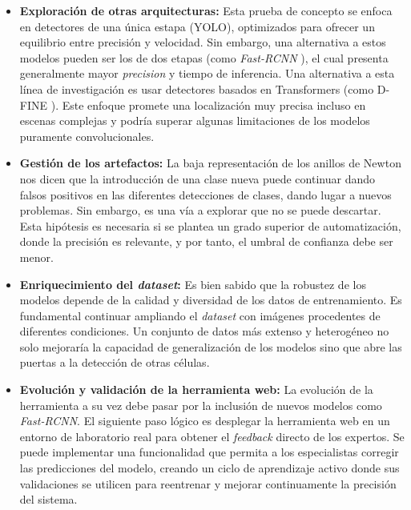 \documentclass[12pt,a4paper,onecolumn,oneside]{report}
\begin{document}
\begin{itemize}
  \item \textbf{Exploración de otras arquitecturas:} Esta prueba de concepto se enfoca en detectores de una única estapa (YOLO), optimizados para ofrecer un equilibrio entre precisión y velocidad. Sin embargo, 
  una alternativa a estos modelos pueden ser los de dos etapas (como \textit{Fast-RCNN} \cite{7410526}), el cual presenta generalmente mayor \textit{precision} y tiempo de inferencia. Una alternativa a esta línea de investigación es usar detectores basados en Transformers
  (como D-FINE \cite{peng2024dfineredefineregressiontask}). Este enfoque promete una localización muy precisa incluso en escenas complejas y podría superar algunas limitaciones de los modelos puramente convolucionales.
  \item \textbf{Gestión de los artefactos:} La baja representación de los anillos de Newton nos dicen que la introducción de una clase nueva puede continuar dando falsos positivos en las diferentes detecciones de clases, dando lugar
  a nuevos problemas. Sin embargo, es una vía a explorar que no se puede descartar. Esta hipótesis es necesaria si se plantea un grado superior de automatización, donde la precisión es relevante, y por tanto, el umbral de confianza debe ser menor.
  \item \textbf{Enriquecimiento del \textit{dataset}:} Es bien sabido que la robustez de los modelos depende de la calidad y diversidad de los datos de entrenamiento. Es fundamental continuar ampliando el \textit{dataset} con imágenes procedentes de diferentes condiciones.
  Un conjunto de datos más extenso y heterogéneo no solo mejoraría la capacidad de generalización de los modelos sino que abre las puertas a la detección de otras células.
  \item \textbf{Evolución y validación de la herramienta web:} La evolución de la herramienta a su vez debe pasar por la inclusión de nuevos modelos como \textit{Fast-RCNN}. El siguiente paso lógico es desplegar la herramienta web en un entorno de laboratorio real 
  para obtener el \textit{feedback} directo de los expertos. Se puede implementar una funcionalidad que permita a los especialistas corregir las predicciones del modelo, creando un ciclo de aprendizaje activo donde sus validaciones se utilicen para reentrenar y mejorar continuamente la precisión del sistema.
\end{itemize}

\renewcommand\bibname{Bibliografía}
\end{document}
